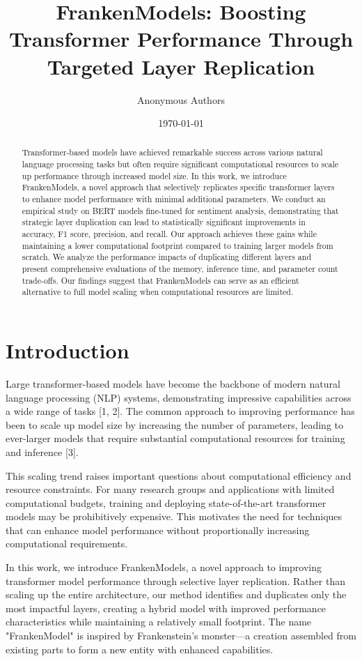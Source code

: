 \documentclass{article}
\title{FrankenModels: Boosting Transformer Performance Through Targeted Layer Replication}
\author{Anonymous Authors}
\date{\today}
\begin{document}
\maketitle

\begin{abstract}
Transformer-based models have achieved remarkable success across various natural language processing tasks but often require significant computational resources to scale up performance through increased model size. In this work, we introduce FrankenModels, a novel approach that selectively replicates specific transformer layers to enhance model performance with minimal additional parameters. We conduct an empirical study on BERT models fine-tuned for sentiment analysis, demonstrating that strategic layer duplication can lead to statistically significant improvements in accuracy, F1 score, precision, and recall. Our approach achieves these gains while maintaining a lower computational footprint compared to training larger models from scratch. We analyze the performance impacts of duplicating different layers and present comprehensive evaluations of the memory, inference time, and parameter count trade-offs. Our findings suggest that FrankenModels can serve as an efficient alternative to full model scaling when computational resources are limited.
\end{abstract}

\section{Introduction}
Large transformer-based models have become the backbone of modern natural language processing (NLP) systems, demonstrating impressive capabilities across a wide range of tasks [1, 2]. The common approach to improving performance has been to scale up model size by increasing the number of parameters, leading to ever-larger models that require substantial computational resources for training and inference [3].

This scaling trend raises important questions about computational efficiency and resource constraints. For many research groups and applications with limited computational budgets, training and deploying state-of-the-art transformer models may be prohibitively expensive. This motivates the need for techniques that can enhance model performance without proportionally increasing computational requirements.

In this work, we introduce FrankenModels, a novel approach to improving transformer model performance through selective layer replication. Rather than scaling up the entire architecture, our method identifies and duplicates only the most impactful layers, creating a hybrid model with improved performance characteristics while maintaining a relatively small footprint. The name "FrankenModel" is inspired by Frankenstein's monster—a creation assembled from existing parts to form a new entity with enhanced capabilities.
\end{document}
